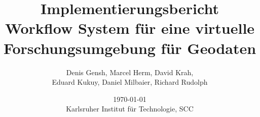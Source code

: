 \documentclass[oneside]{scrbook}
\title{
    \vspace{-3.5cm}
    \Huge {\textbf{Implementierungsbericht}}\\
    \vspace{2cm}
    \Large{\textbf{Workflow System für eine virtuelle Forschungsumgebung für Geodaten}}\\
    \vspace{1cm}
}
\author{
    Denis Gensh, Marcel Herm, David Krah,\\
    Eduard Kukuy, Daniel Milbaier, Richard Rudolph\\
} %
\date{
    \today \\
    Karlsruher Institut für Technologie, SCC\\
}
\begin{document}
    

     
    
    
    
    
    
    
    
    
    
    
    
    
    
    \printglossaries
\end{document}
